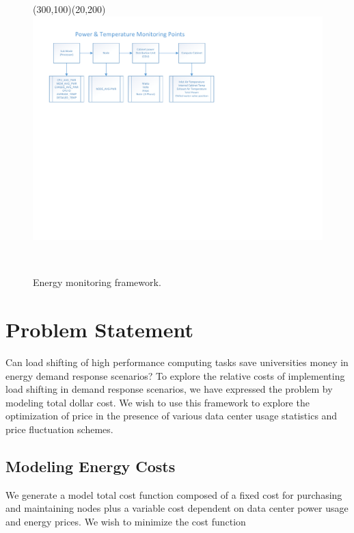 \begin{figure}[t]
	\begin{center}
		
				\begin{picture}(300,100)(20,200)
				\includegraphics[scale=0.50]{edeals/ray_fig}
				\end{picture}\\
	\end{center}
	\caption{Energy monitoring framework.}
	\label{ray_fig}
\end{figure}


\section{Problem Statement}

Can load shifting of high performance computing tasks save universities money in energy demand response scenarios?  To explore the relative costs of implementing load shifting in demand response scenarios, we have expressed the problem by modeling total dollar cost.  We wish to use this framework to explore the optimization of price in the presence of various data center usage statistics and price fluctuation schemes.

\subsection{Modeling Energy Costs}

We generate a model total cost function composed of a fixed cost for purchasing and maintaining nodes plus a variable cost dependent on data center power usage and energy prices.  We wish to minimize the cost function

